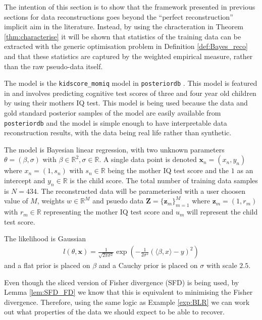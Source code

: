 \documentclass[hyperref]{article}
\theoremstyle{plain}
\theoremstyle{remark}
\newcommand{\bx}{\mathbf{x}}
\newcommand{\bz}{\mathbf{z}}
\newcommand{\bZ}{\mathbf{Z}}
\newcommand{\bbR}{\mathbb{R}}
\begin{document}
The intention of this section is to show that the framework presented in previous sections for data reconstructions goes beyond the ``perfect reconstruction'' implicit aim in the literature. Instead, by using the chracteration in Theorem \ref{thm:characterise} it will be shown that statistics of the training data can be extracted with the generic optimisation problem in Definition \ref{def:Bayes_reco} and that these statistics are captured by the weighted empirical measure, rather than the raw pseudo-data itself. 

The model is the \texttt{kidscore\_momiq} model in \texttt{posteriordb} \citep{posteriordb}. This model is featured in \citet[Chapter 3]{Gelman_Hill_2006} and involves predicting cognitive test scores of three and four year old children by using their mothers IQ test. This model is being used because the data and gold standard posterior samples of the model are easily available from \texttt{posteriordb} and the model is simple enough to have interpretable data reconstruction results, with the data being real life rather than synthetic. 

The model is Bayesian linear regression, with two unknown parameters $\theta = (\beta,\sigma)$ with $\beta\in\bbR^{2}, \sigma\in\bbR$. A single data point is denoted $\bx_{n} = (x_{n},y_{n})$ where $x_{n} = (1,s_{n})$ with $s_{n}\in\bbR$ being the mother IQ test score and the $1$ as an intercept and $y_{n}\in\bbR$ is the child score. The total number of training data samples is $N=434$. The reconstructed data will be parameterised with a user choosen value of $M$, weights $w\in\bbR^{M}$ and psuedo data $\bZ = \{\bz_{m}\}_{m=1}^{M}$ where $\bz_{m} = (1,r_{m})$ with $r_{m}\in\bbR$ representing the mother IQ test score and $u_{m}$ will represent the child test score. 

The likelihood is Gaussian 
\begin{align*}
	l(\theta,\bx) = \frac{1}{\sqrt{2\pi\sigma^{2}}}\exp\left(-\frac{1}{2\sigma^{2}}(\langle \beta, x\rangle - y)^{2}\right)
\end{align*}
and a flat prior is placed on $\beta$ and a Cauchy prior is placed on $\sigma$ with scale $2.5$. 

Even though the sliced version of Fisher divergence (SFD) \citep{song2019sliced} is being used, by Lemma \ref{lem:SFD_FD} we know that this is equivalent to minimising the Fisher divergence. Therefore, using the same logic as Example \ref{exp:BLR} we can work out what properties of the data we should expect to be able to recover. 
\end{document}
